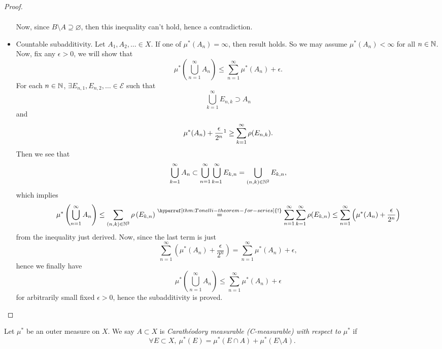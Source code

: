 \begin{proof}
\begin{itemize}
\[\begin{split}
			      \end{split}
		      \]
		      Now, since \(B\setminus A\supseteq \varnothing \), then this inequality can't hold, hence a contradiction\conta.
		\item Countable subadditivity. Let \(A_1, A_2, \ldots \in X \). If one of \(\mu^{*} (A_{n}) = \infty \), then result holds.
		      So we may assume \(\mu^{*} (A_n)<\infty \) for all \(n\in \mathbb{\MakeUppercase{N}} \). Now, fix any \(\epsilon >0\),
		      we will show that
		      \[
			      \mu^{*} \left(\bigcup\limits_{n=1}^{\infty} A_n\right)\leq \sum\limits_{n=1}^{\infty} \mu^{*} (A_n)+\epsilon.
		      \]
		      For each \(n\in\mathbb{\MakeUppercase{N}} \), \(\exists E_{n, 1}, E_{n, 2}, \ldots \in \mathcal{E}\) such that
		      \[
			      \bigcup\limits_{k=1}^{\infty} E_{n, k}\supset A_n
		      \]
		      and
		      \[
			      \mu^{*} (A_n)+\frac{\epsilon}{2^n}\footnotemark \geq \sum\limits_{k=1}^{\infty} \rho(E_{n, k}).
		      \]
		      Then we see that
		      \[
			      \bigcup\limits_{k=1}^{\infty} A_n \subset \bigcup\limits_{n=1}^{\infty} \bigcup\limits_{k=1}^{\infty} E_{k, n} = \bigcup\limits_{(n, k)\in\mathbb{\MakeUppercase{N}} ^2} E_{k, n},
		      \]
		      which implies
		      \[
			      \mu^{*} \left(\bigcup\limits_{n=1}^{\infty} A_{n}\right)
			      \leq \sum\limits_{(n, k)\in\mathbb{\MakeUppercase{N}} ^2} \rho\left(E_{k, n}\right)
			      \overset{\hyperref[thm:Tonelli-theorem-for-series]{\text{!}}}{=} \sum\limits_{n=1}^{\infty} \sum\limits_{k=1}^{\infty} \rho(E_{k, n})
			      \leq \sum\limits_{n=1}^{\infty} \left(\mu^{*} (A_n) + \frac{\epsilon}{2^n}\right)
		      \]
		      from the inequality just derived. Now, since the last term is just
		      \[
			      \sum\limits_{n=1}^{\infty} \left(\mu^{*} (A_n) + \frac{\epsilon}{2^n}\right) = \sum\limits_{n=1}^{\infty} \mu^{*} (A_n)+\epsilon,
		      \]
		      hence we finally have
		      \[
			      \mu^{*} \left(\bigcup\limits_{n=1}^{\infty} A_{n}\right)\leq \sum\limits_{n=1}^{\infty} \mu^{*} (A_n)+\epsilon
		      \]
		      for arbitrarily small fixed \(\epsilon >0\), hence the subadditivity is proved.
	\end{itemize}
\end{proof}

\begin{definition}\label{def:C-measurable}
	Let \(\mu^{*} \) be an outer measure on \(X\). We say \(A\subset X\) is \emph{Carathéodory measurable (C-measurable) with respect to \(\mu^{*} \)} if
	\[
		\forall E\subset X,\ \mu^{*} (E) = \mu^{*} \left(E\cap A\right) + \mu^{*} \left(E\setminus A\right).
	\]
\end{definition}

